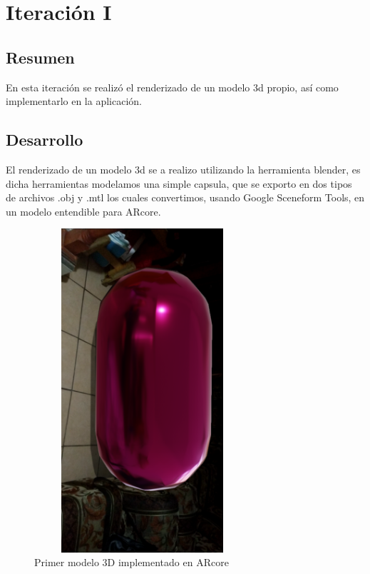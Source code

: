 \section{Iteración I}
\subsection{Resumen}
En esta iteración se realizó el renderizado de un modelo 3d propio, así como implementarlo en la aplicación.
\subsection{Desarrollo}
El renderizado de un modelo 3d se a realizo utilizando la herramienta blender, es dicha herramientas modelamos una simple capsula, que se exporto en dos tipos de archivos .obj y .mtl los cuales convertimos, usando Google Sceneform Tools, en un modelo entendible para ARcore.
\begin{figure}[H]
	\centering
	\includegraphics[width=8cm,height=12cm]{imagenes/iteraciones/AR2.png}
	\caption{Primer modelo 3D implementado en ARcore}
	\label{fig:1modelo}
\end{figure} 